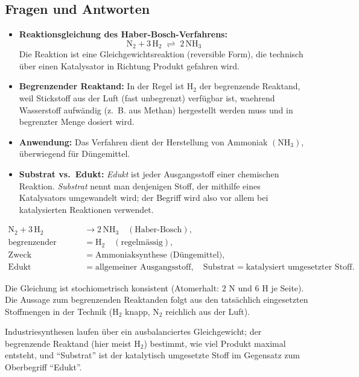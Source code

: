 
\subsection*{Fragen und Antworten}
\begin{itemize}
  \item[a)] \textbf{Reaktionsgleichung des Haber-Bosch-Verfahrens:}
        \begin{equation}
          \mathrm{N_2} + 3\,\mathrm{H_2} \;\rightleftharpoons\;
          2\,\mathrm{NH_3}
        \end{equation}
        Die Reaktion ist eine Gleichgewichtsreaktion (reversible Form), die
        technisch über einen Katalysator in Richtung Produkt gefahren wird.
  \item[b)] \textbf{Begrenzender Reaktand:} In der Regel ist
        $\mathrm{H_2}$ der begrenzende Reaktand, weil Stickstoff aus der Luft
        (fast unbegrenzt) verfügbar ist, waehrend Wasserstoff aufwändig
        (z.~B. aus Methan) hergestellt werden muss und in begrenzter Menge
        dosiert wird.
  \item[c)] \textbf{Anwendung:} Das Verfahren dient der Herstellung von
        Ammoniak $\mathrm{(NH_3)}$, überwiegend für Düngemittel.
  \item[d)] \textbf{Substrat vs.\ Edukt:} \emph{Edukt} ist jeder
        Ausgangsstoff einer chemischen Reaktion. \emph{Substrat} nennt man
        denjenigen Stoff, der mithilfe eines Katalysators umgewandelt wird;
        der Begriff wird also vor allem bei katalysierten Reaktionen
        verwendet.
\end{itemize}

\begin{ergebnis}
\begin{align*}
  \mathrm{N_2} + 3\,\mathrm{H_2} &\to 2\,\mathrm{NH_3}
    \quad(\text{Haber-Bosch}),\\
  \text{begrenzender Reaktand} &= \mathrm{H_2}\quad(\text{regelmässig}),\\
  \text{Zweck} &= \text{Ammoniaksynthese (Düngemittel)},\\
  \text{Edukt} &= \text{allgemeiner Ausgangsstoff},\quad
  \text{Substrat} = \text{katalysiert umgesetzter Stoff}.
\end{align*}
\end{ergebnis}

\begin{kontrolle}
Die Gleichung ist stochiometrisch konsistent (Atomerhalt: $2$ N und $6$ H je
Seite). Die Aussage zum begrenzenden Reaktanden folgt aus den tatsächlich
eingesetzten Stoffmengen in der Technik (H$_2$ knapp, N$_2$ reichlich aus der
Luft).
\end{kontrolle}

\begin{merksatz}
Industriesynthesen laufen über ein ausbalanciertes Gleichgewicht; der
begrenzende Reaktand (hier meist H$_2$) bestimmt, wie viel Produkt maximal
entsteht, und ``Substrat'' ist der katalytisch umgesetzte Stoff im Gegensatz
zum Oberbegriff ``Edukt''.
\end{merksatz}
